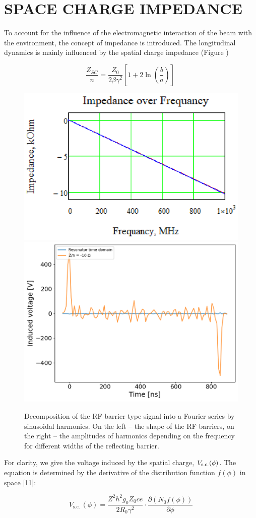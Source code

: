 \documentclass[
aps,%
12pt,%
final,%
notitlepage,%
oneside,%
onecolumn,%
nobibnotes,%
nofootinbib,%
superscriptaddress,%
noshowpacs,%
centertags]%
{revtex4}
\begin{document}
\section{SPACE CHARGE IMPEDANCE}

To account for the influence of the electromagnetic interaction of the beam with the environment, the concept of impedance is introduced. The longitudinal dynamics is mainly influenced by the spatial charge impedance (Figure ) \cite{Laclare}

\begin{equation}
\frac{Z_{SC}}{n}=\frac{Z_0}{2\beta\gamma^2}\left[1+2\ln{\left(\frac{b}{a}\right)}\right]\ 
\label{eq:zsc}
\end{equation}

\begin{figure}
\setcaptionmargin{5mm}
   \includegraphics*[width=.49\columnwidth]{img/fig_06-1}
   \includegraphics*[width=.49\columnwidth]{img/fig_07-1}
\caption{Decomposition of the RF barrier type signal into a Fourier series by sinusoidal harmonics. On the left -- the shape of the RF barriers, on the right -- the amplitudes of harmonics depending on the frequency for different widths of the reflecting barrier.}
\label{fig:exp}
\end{figure}

\par For clarity, we give the voltage induced by the spatial charge, $V_{\rm{s.c.}}(\phi)$. The equation is determined by the derivative of the distribution function $f(\phi)$ in space [11]:

\begin{equation}
V_{\mathrm{s.c.\ }}\left(\phi\right)=\frac{Z^2h^2g_0Z_0ce}{2R_0\gamma^2}\cdot\frac{\partial\left(N_0f\left(\phi\right)\right)}{\partial\phi}
\label{eq:Vsc}
\end{equation}
\end{document}
